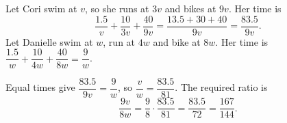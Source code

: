 Let Cori swim at $v$, so she runs at $3v$ and bikes at $9v$. Her time is
\[\dfrac{1.5}{v}+\dfrac{10}{3v}+\dfrac{40}{9v}=\dfrac{13.5+30+40}{9v}=\dfrac{83.5}{9v}.\]
Let Danielle swim at $w$, run at $4w$ and bike at $8w$. Her time is $\dfrac{1.5}{w}+\dfrac{10}{4w}+\dfrac{40}{8w}=\dfrac{9}{w}$.

Equal times give $\dfrac{83.5}{9v}=\dfrac9w$, so $\dfrac vw=\dfrac{83.5}{81}$. The required ratio is
\[\dfrac{9v}{8w}=\dfrac{9}{8}\cdot\dfrac{83.5}{81}=\dfrac{83.5}{72}=\boxed{\dfrac{167}{144}}.\]
